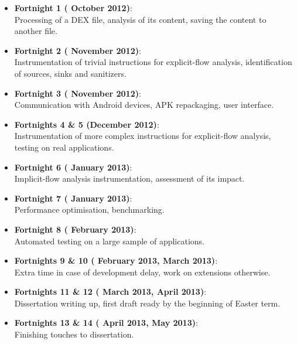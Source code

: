 \documentclass[12pt]{article}
\begin{document}
\begin{itemize}

    \item{\textbf{Fortnight 1 ( October 2012)}: \\
          Processing of a DEX file, analysis of its content, saving the 
          content to another file.}
    \item{\textbf{Fortnight 2 ( November 2012)}: \\
          Instrumentation of trivial instructions for explicit-flow analysis,
          identification of sources, sinks and sanitizers.}
    \item{\textbf{Fortnight 3 ( November 2012)}: \\
          Communication with Android devices, APK repackaging, user interface.}
    \item{\textbf{Fortnights 4 \& 5 (December 2012)}: \\
          Instrumentation of more complex instructions for explicit-flow
          analysis, testing on real applications.}
    \item{\textbf{Fortnight 6 ( January 2013)}: \\
          Implicit-flow analysis instrumentation, assessment of its impact.}
    \item{\textbf{Fortnight 7 ( January 2013)}: \\
          Performance optimisation, benchmarking.}
    \item{\textbf{Fortnight 8 ( February 2013)}: \\
          Automated testing on a large sample of applications.}
    \item{\textbf{Fortnights 9 \& 10 ( February 2013, 
                                        March 2013)}: \\
          Extra time in case of development delay, work on extensions
          otherwise.}
    \item{\textbf{Fortnights 11 \& 12 ( March 2013, 
                                        April 2013)}: \\
          Dissertation writing up, first draft ready by the beginning of
          Easter term.}
    \item{\textbf{Fortnights 13 \& 14 ( April 2013, 
                                        May 2013)}: \\
          Finishing touches to dissertation.}
    

\end{itemize}
\end{document}
